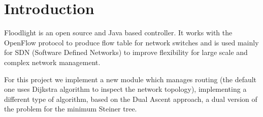 \chapter{Introduction}\label{ch:intro}

Floodlight is an open source and Java based controller. It works with the
OpenFlow protocol to produce flow table for network switches and is used mainly
for SDN (Software Defined Networks) to improve flexibility for large scale and
complex network management.


For this project we implement a new module which manages routing (the default
one uses Dijkstra algorithm to inspect the network topology), implementing a
different type of algorithm, based on the Dual Ascent approach, a dual version
of the problem for the minimum Steiner tree.
